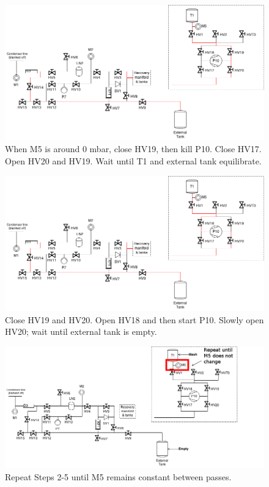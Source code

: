 \documentclass[a4paper,10pt]{article}
\begin{document}
\begin{figure}[htbp!]
 \centering
 \includegraphics[width=\textwidth]{./mash-cleaning-schematic-4-gas-to-t3.png}
 \caption{When M5 is around 0 mbar, close HV19, then kill P10.  Close HV17.  Open HV20 and HV19.  Wait until T1 and external tank equilibrate.}
 \label{d}
\end{figure}


\begin{figure}[htbp!]
 \centering
 \includegraphics[width=\textwidth]{./mash-cleaning-schematic-5-pump-gas-to-t3.png}
 \caption{Close HV19 and HV20.  Open HV18 and then start P10.  Slowly open HV20; wait until external tank is empty.}
 \label{e}
\end{figure}

\begin{figure}[htbp!]
 \centering
 \includegraphics[width=\textwidth]{./mash-cleaning-schematic-6-repeat.png}
 \caption{Repeat Steps 2-5 until M5 remains constant between passes.}
 \label{f}
\end{figure}
\end{document}
